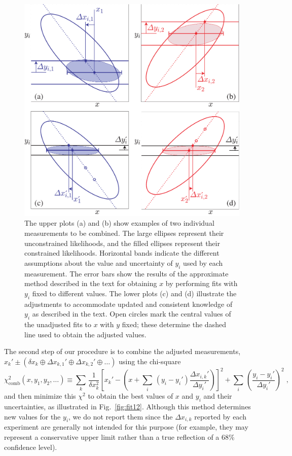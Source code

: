\begin{figure}
\begin{center}
\includegraphics[width=6.0in]{figures/meth/figure2}
\end{center}
\caption{The upper plots (a) and (b) show examples of two individual
  measurements to be combined. The large ellipses represent their
  unconstrained likelihoods, and the filled ellipses represent their
  constrained likelihoods. Horizontal bands indicate the different
  assumptions about the value and uncertainty of $y_i$ used by each
  measurement. The error bars show the results of the approximate
  method described in the text for obtaining $x$ by performing fits
  with $y_i$ fixed to different values. The lower plots (c) and (d)
  illustrate the adjustments to accommodate updated and consistent
  knowledge of $y_i$ as described in the text. Open circles mark the
  central values of the unadjusted fits to $x$ with $y$ fixed; these
  determine the dashed line used to obtain the adjusted values. }
\label{fig:multifit}
\end{figure}

The second step of our procedure is to combine the adjusted
measurements, $x_k'\pm (\delta x_k\oplus \Delta x_{k,1}'\oplus \Delta
x_{k,2}'\oplus\ldots)$ using the chi-square 
\begin{equation}
\chi^2_{\text{comb}}(x,y_1,y_2,\ldots) \equiv \sum_k\,
\frac{1}{\delta x_k^2}\left[
x_k' - \left(x + \sum_i\,(y_i-y_i')\frac{\Delta x_{i,k}'}{\Delta y_i'}\right)
\right]^2 + \sum_i\,
\left(\frac{y_i - y_i'}{\Delta y_i'}\right)^2 \; ,
\end{equation}
and then minimize this $\chi^2$ to obtain the best values of $x$ and
$y_i$ and their uncertainties, as illustrated in
Fig.~\ref{fig:fit12}. Although this method determines new values for
the $y_i$, we do not report them since the $\Delta x_{i,k}$ reported
by each experiment are generally not intended for this purpose (for
example, they may represent a conservative upper limit rather than a
true reflection of a 68\% confidence level).

